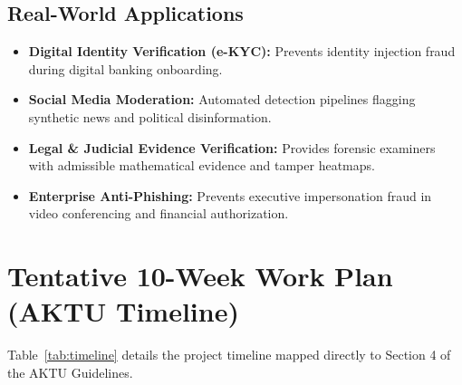 \documentclass[12pt,a4paper]{report}
\begin{document}
\section{Real-World Applications}
\begin{itemize}
    \item \textbf{Digital Identity Verification (e-KYC):} Prevents identity injection fraud during digital banking onboarding.
    \item \textbf{Social Media Moderation:} Automated detection pipelines flagging synthetic news and political disinformation.
    \item \textbf{Legal \& Judicial Evidence Verification:} Provides forensic examiners with admissible mathematical evidence and tamper heatmaps.
    \item \textbf{Enterprise Anti-Phishing:} Prevents executive impersonation fraud in video conferencing and financial authorization.
\end{itemize}

\newpage

\chapter{Tentative 10-Week Work Plan (AKTU Timeline)}
Table~\ref{tab:timeline} details the project timeline mapped directly to Section 4 of the AKTU Guidelines.
\end{document}
